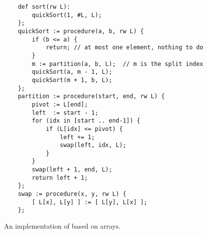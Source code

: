 \begin{figure}[!ht]
  \centering
\begin{verbatim}
    def sort(rw L):
        quickSort(1, #L, L);
    };
    quickSort := procedure(a, b, rw L) {
        if (b <= a) {
            return; // at most one element, nothing to do
        }
        m := partition(a, b, L);  // m is the split index
        quickSort(a, m - 1, L);
        quickSort(m + 1, b, L);
    };
    partition := procedure(start, end, rw L) {
        pivot := L[end];
        left  := start - 1;
        for (idx in [start .. end-1]) {
            if (L[idx] <= pivot) {
                left += 1;
                swap(left, idx, L);
            }
        }
        swap(left + 1, end, L);
        return left + 1;
    };
    swap := procedure(x, y, rw L) {
        [ L[x], L[y] ] := [ L[y], L[x] ];
    };
\end{verbatim}
\vspace*{-0.3cm}
  \caption{An implementation of  based on arrays.}
  \label{fig:quick-sort-array.stlx}
\end{figure}

